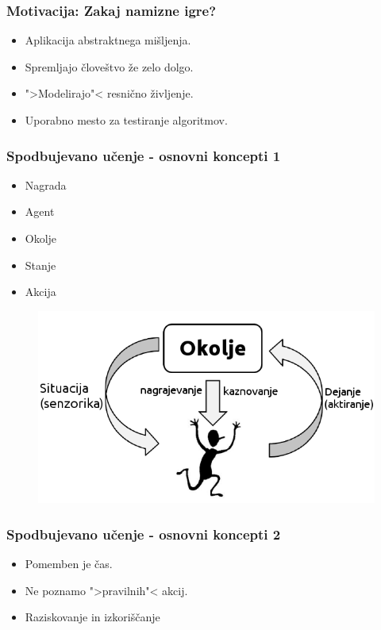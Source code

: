 \documentclass{beamer}    %
\begin{document}
\begin{frame}
    \frametitle{Motivacija: Zakaj namizne igre?}
    \begin{itemize}
        \item Aplikacija abstraktnega mišljenja.
        \item Spremljajo človeštvo že zelo dolgo.
        \item ">Modelirajo"< resnično življenje.
        \item Uporabno mesto za testiranje algoritmov.
    \end{itemize}
\end{frame}


\begin{frame}
    \frametitle{Spodbujevano učenje - osnovni koncepti 1}
    \begin{multicols}{2}
    \begin{itemize}
        \item Nagrada
        \item Agent
        \item Okolje
        \item Stanje
        \item Akcija
    \end{itemize}
    \end{multicols}

    \begin{figure}
        \includegraphics[scale=0.5]{slike/RLloop.png}
    \end{figure}
\end{frame}


\begin{frame}
    \frametitle{Spodbujevano učenje - osnovni koncepti 2}
    \begin{itemize}
        \item Pomemben je čas.
        \item Ne poznamo ">pravilnih"< akcij.
        \item Raziskovanje in izkoriščanje
    \end{itemize}
\end{frame}
\end{document}
